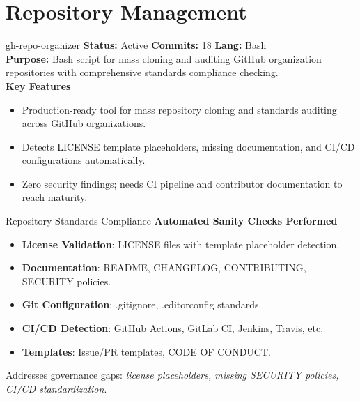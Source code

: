 \documentclass[aspectratio=169]{beamer}
\begin{document}
\section{Repository Management}

\begin{frame}{gh-repo-organizer \; \faDownload}
  \textbf{Status:} Active \hfill \textbf{Commits:} 18 \hfill \textbf{Lang:} Bash\\[2mm]
  \textbf{Purpose:} Bash script for mass cloning and auditing GitHub organization repositories with comprehensive standards compliance checking.\\[2mm]
  \textbf{Key Features}
  \begin{itemize}
    \item Production-ready tool for mass repository cloning and standards auditing across GitHub organizations.
    \item Detects LICENSE template placeholders, missing documentation, and CI/CD configurations automatically.
    \item Zero security findings; needs CI pipeline and contributor documentation to reach maturity.
  \end{itemize}
\end{frame}

\begin{frame}{Repository Standards Compliance}
  \faClipboardCheck\;
  \textbf{Automated Sanity Checks Performed}
  \begin{itemize}
    \item \textbf{License Validation}: LICENSE files with template placeholder detection.
    \item \textbf{Documentation}: README, CHANGELOG, CONTRIBUTING, SECURITY policies.
    \item \textbf{Git Configuration}: .gitignore, .editorconfig standards.
    \item \textbf{CI/CD Detection}: GitHub Actions, GitLab CI, Jenkins, Travis, etc.
    \item \textbf{Templates}: Issue/PR templates, CODE OF CONDUCT.
  \end{itemize}
  \begin{tcolorbox}
    \faInfoCircle\; Addresses governance gaps: \emph{license placeholders, missing SECURITY policies, CI/CD standardization}.
  \end{tcolorbox}
\end{frame}
\end{document}
